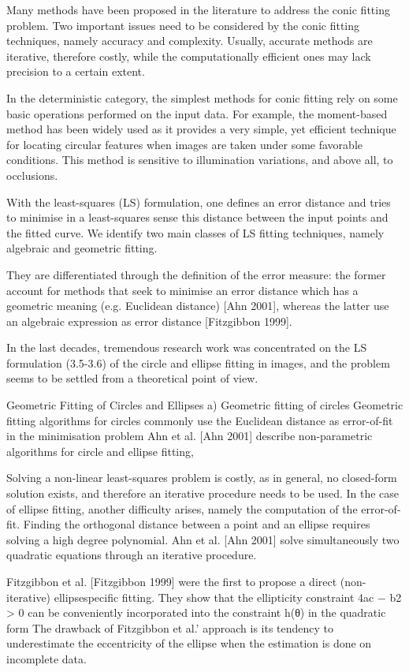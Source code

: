 \documentclass[a4paper]{report}
\begin{document}
Many methods have been proposed in the literature to address the conic fitting problem. Two
important issues need to be considered by the conic fitting techniques, namely accuracy and
complexity. Usually, accurate methods are iterative, therefore costly, while the computationally
efficient ones may lack precision to a certain extent.

In the deterministic category, the simplest methods for conic fitting rely on some
basic operations performed on the input data. For example, the moment-based method has
been widely used as it provides a very simple, yet efficient technique for locating circular features
when images are taken under some favorable conditions.
This method
is sensitive to illumination variations, and above all, to occlusions.

With the least-squares (LS) formulation, one defines an error distance and tries to minimise
in a least-squares sense this distance between the input points and the fitted curve. We identify
two main classes of LS fitting techniques, namely algebraic and geometric fitting.

They are
differentiated through the definition of the error measure: the former account for methods that
seek to minimise an error distance which has a geometric meaning (e.g. Euclidean distance)
[Ahn 2001], whereas the latter use an algebraic expression
as error distance [Fitzgibbon 1999].

In the last decades, tremendous research work was concentrated on the LS formulation (3.5-3.6)
of the circle and ellipse fitting in images, and the problem seems to be settled from a theoretical
point of view.

Geometric Fitting of Circles and Ellipses
a) Geometric fitting of circles
Geometric fitting algorithms for circles commonly use the Euclidean distance as error-of-fit
in the minimisation problem
Ahn et al. [Ahn 2001] describe non-parametric algorithms for circle and ellipse fitting,

Solving a non-linear least-squares problem is costly, as in general, no closed-form solution
exists, and therefore an iterative procedure needs to be used. In the case of ellipse fitting,
another difficulty arises, namely the computation of the error-of-fit. Finding the orthogonal
distance between a point and an ellipse requires solving a high degree polynomial.
Ahn et al. [Ahn 2001] solve simultaneously two quadratic equations through
an iterative procedure. 

Fitzgibbon et al. [Fitzgibbon 1999] were the first to propose a direct (non-iterative) ellipsespecific
fitting. They show that the ellipticity constraint 4ac − b2 > 0 can be conveniently
incorporated into the constraint h(θ) in the quadratic form
The drawback of Fitzgibbon et al.’
approach is its tendency to underestimate the eccentricity of the ellipse when the estimation is
done on incomplete data.
\end{document}
